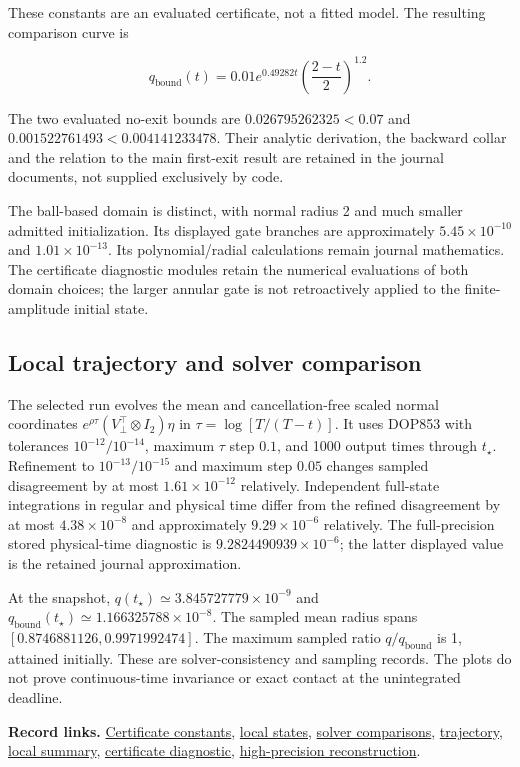 \documentclass[11pt,a4paper]{article}
\begin{document}
These constants are an evaluated certificate, not a fitted model. The
resulting comparison curve is

\[
q_{\mathrm{bound}}(t)=0.01e^{0.49282t}\left(\frac{2-t}{2}\right)^{1.2}.
\]

The two evaluated no-exit bounds are \(0.026795262325<0.07\) and
\(0.001522761493<0.004141233478\). Their analytic derivation, the
backward collar and the relation to the main first-exit result are
retained in the journal documents, not supplied exclusively by code.

The ball-based domain is distinct, with normal radius 2 and much smaller
admitted initialization. Its displayed gate branches are approximately
\(5.45\times10^{-10}\) and \(1.01\times10^{-13}\). Its polynomial/radial
calculations remain journal mathematics. The certificate diagnostic
modules retain the numerical evaluations of both domain choices; the
larger annular gate is not retroactively applied to the finite-amplitude
initial state.

\subsection{Local trajectory and solver
comparison}\label{c08-trajectory}

The selected run evolves the mean and cancellation-free scaled normal
coordinates \(e^{\rho\tau}(V_\perp^\top\otimes I_2)\eta\) in
\(\tau=\log[T/(T-t)]\). It uses DOP853 with tolerances
\(10^{-12}/10^{-14}\), maximum \(\tau\) step \(0.1\), and 1000 output
times through \(t_\star\). Refinement to \(10^{-13}/10^{-15}\) and
maximum step \(0.05\) changes sampled disagreement by at most
\(1.61\times10^{-12}\) relatively. Independent full-state integrations
in regular and physical time differ from the refined disagreement by at
most \(4.38\times10^{-8}\) and approximately \(9.29\times10^{-6}\)
relatively. The full-precision stored physical-time diagnostic is
\(9.2824490939\times10^{-6}\); the latter displayed value is the
retained journal approximation.

At the snapshot, \(q(t_\star)\simeq3.845727779\times10^{-9}\) and
\(q_{\mathrm{bound}}(t_\star)\simeq1.166325788\times10^{-8}\). The
sampled mean radius spans \([0.8746881126,0.9971992474]\). The maximum
sampled ratio \(q/q_{\mathrm{bound}}\) is 1, attained initially. These
are solver-consistency and sampling records. The plots do not prove
continuous-time invariance or exact contact at the unintegrated
deadline.

\textbf{Record links.}
\href{../data/records/local_certificate.json}{Certificate constants},
\href{../data/records/local_initial_states.csv}{local states},
\href{../data/records/local_solver_comparison.csv}{solver comparisons},
\href{../data/records/local_trajectory.csv}{trajectory},
\href{../data/records/local_summary.json}{local summary},
\href{../code/benchmark_certificate.py}{certificate diagnostic},
\href{../code/certificate_reconstruction.py}{high-precision
reconstruction}.
\end{document}
